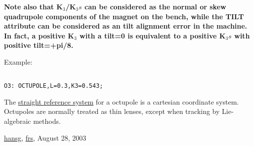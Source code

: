 \textbf{  Note also that K$_3$/K$_3s$ can be considered as the normal or skew quadrupole components of the magnet on the bench, while the TILT attribute can be considered as an tilt alignment error in the machine. In fact, a positive K$_3$ with a tilt=0 is equivalent to a positive K$_3s$ with positive tilt=+pi/8.  }

Example: 
\begin{verbatim}

O3: OCTUPOLE,L=0.3,K3=0.543;
\end{verbatim} The \href{local_system.html#straight}{straight reference system} for a octupole is a cartesian coordinate system. Octupoles are normally treated as thin lenses, except when tracking by Lie-algebraic methods.  

\href{http://www.cern.ch/Hans.Grote/hansg_sign.html}{hansg}, \href{http://www.cern.ch/Frank.Schmidt/frs_sign.html}{frs}, August 28, 2003  

